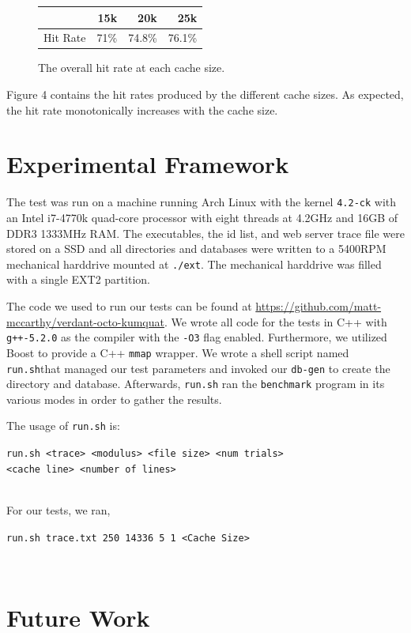 \documentclass[notitlepage, twocolumn,11pt]{article}
\begin{document}
\begin{figure}[h!]
\centering
\begin{tabular}{l|r|r|r}
&15k&20k&25k\\\hline
Hit Rate& 71\% & 74.8\% & 76.1\%
\end{tabular}
\caption{The overall hit rate at each cache size.}
\end{figure}

Figure 4 contains the hit rates produced by the different cache sizes.
As expected, the hit rate monotonically increases with the cache size.

\section{Experimental Framework}

The test was run on a machine running Arch Linux with the kernel \verb|4.2-ck| with an Intel i7-4770k quad-core processor with eight threads at 4.2GHz and 16GB of DDR3 1333MHz RAM.
The executables, the id list, and web server trace file were stored on a SSD and all directories and databases were written to a 5400RPM mechanical harddrive mounted at \verb|./ext|.
The mechanical harddrive was filled with a single EXT2 partition.

The code we used to run our tests can be found at \url{https://github.com/matt-mccarthy/verdant-octo-kumquat}.
We wrote all code for the tests in C++ with \verb|g++-5.2.0| as the compiler with the \verb|-O3| flag enabled.
Furthermore, we utilized Boost to provide a C++ \verb|mmap| wrapper.
We wrote a shell script named \verb|run.sh|that managed our test parameters and invoked our \verb|db-gen| to create the directory and database.
Afterwards, \verb|run.sh| ran the \verb|benchmark| program in its various modes in order to gather the results.

The usage of \verb|run.sh| is:\\
\begin{footnotesize}
\verb|run.sh <trace> <modulus> <file size> <num trials>|\\
\verb|<cache line> <number of lines>|
\end{footnotesize}\\
For our tests, we ran,\\
\begin{footnotesize}
\verb|run.sh trace.txt 250 14336 5 1 <Cache Size>|
\end{footnotesize}\\
\section{Future Work}
\end{document}

